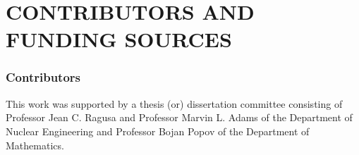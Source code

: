 \chapter*{CONTRIBUTORS AND FUNDING SOURCES}




%
%
% 
%
%
%
%
%

\subsection*{Contributors}
This work was supported by a thesis (or) dissertation committee consisting of Professor Jean C. Ragusa and Professor Marvin L. Adams of the Department of Nuclear Engineering and Professor Bojan Popov of the Department of Mathematics.


